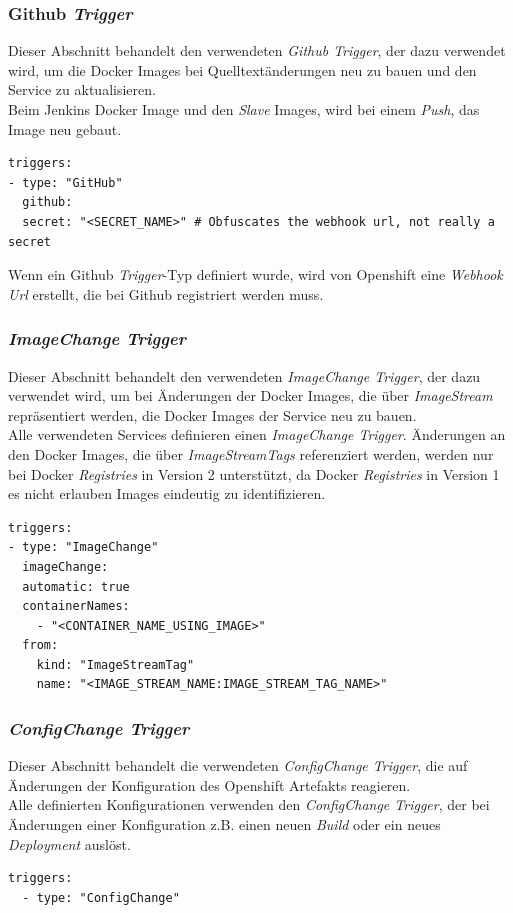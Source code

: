 \pagebreak

\subsubsection{Github \emph{Trigger}}
Dieser Abschnitt behandelt den verwendeten \emph{Github Trigger}, der dazu verwendet wird, um die Docker Images bei Quelltextänderungen neu zu bauen und den Service zu aktualisieren.\\

Beim Jenkins Docker Image und den \emph{Slave} Images, wird bei einem \emph{Push}, das Image neu gebaut.

\begin{verbatim}
triggers:
- type: "GitHub"
  github:
  secret: "<SECRET_NAME>" # Obfuscates the webhook url, not really a secret
\end{verbatim}
Wenn ein Github \emph{Trigger}-Typ definiert wurde, wird von Openshift eine \emph{Webhook Url} erstellt, die bei Github registriert werden muss.

\subsubsection{\emph{ImageChange Trigger}}
Dieser Abschnitt behandelt den verwendeten \emph{ImageChange Trigger}, der dazu verwendet wird, um bei Änderungen der Docker Images, die über \emph{ImageStream} repräsentiert werden, die Docker Images der Service neu zu bauen.\\

Alle verwendeten Services definieren einen \emph{ImageChange Trigger}. Änderungen an den Docker Images, die über \emph{ImageStreamTags} referenziert werden, werden nur bei Docker \emph{Registries} in Version 2 unterstützt, da Docker \emph{Registries} in Version 1 es nicht erlauben Images eindeutig zu identifizieren.
\begin{verbatim}
triggers:
- type: "ImageChange"
  imageChange:
  automatic: true
  containerNames:
    - "<CONTAINER_NAME_USING_IMAGE>" 
  from:
    kind: "ImageStreamTag"
    name: "<IMAGE_STREAM_NAME:IMAGE_STREAM_TAG_NAME>"
\end{verbatim}

\subsubsection{\emph{ConfigChange Trigger}}
Dieser Abschnitt behandelt die verwendeten \emph{ConfigChange Trigger}, die auf Änderungen der Konfiguration des Openshift Artefakts reagieren.\\

Alle definierten Konfigurationen verwenden den \emph{ConfigChange Trigger}, der bei Änderungen einer Konfiguration z.B. einen neuen \emph{Build} oder ein neues \emph{Deployment} auslöst.
\begin{verbatim}
triggers:
  - type: "ConfigChange"
\end{verbatim}